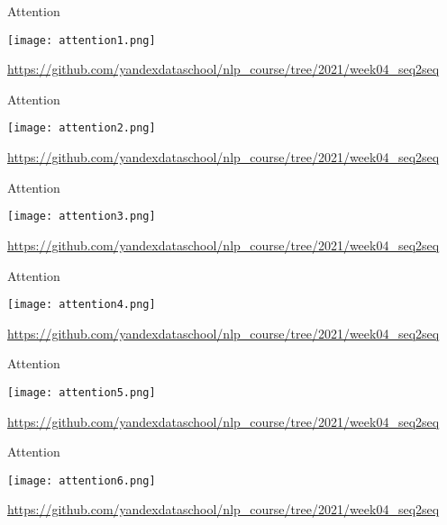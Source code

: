\documentclass[notes,12pt, aspectratio=169]{beamer}
\begin{document}
\begin{frame}{Attention}
	\begin{center}
		\texttt{[image: attention1.png]}
	\end{center}
	\vfill
	\footnotesize  {\color{blue} \url{https://github.com/yandexdataschool/nlp_course/tree/2021/week04_seq2seq}} 
\end{frame} 

\begin{frame}{Attention}
	\begin{center}
		\texttt{[image: attention2.png]}
	\end{center}
	\vfill
	\footnotesize  {\color{blue} \url{https://github.com/yandexdataschool/nlp_course/tree/2021/week04_seq2seq}} 
\end{frame} 

\begin{frame}{Attention}
	\begin{center}
		\texttt{[image: attention3.png]}
	\end{center}
	\vfill
	\footnotesize  {\color{blue} \url{https://github.com/yandexdataschool/nlp_course/tree/2021/week04_seq2seq}} 
\end{frame} 

\begin{frame}{Attention}
	\begin{center}
		\texttt{[image: attention4.png]}
	\end{center}
	\vfill
	\footnotesize  {\color{blue} \url{https://github.com/yandexdataschool/nlp_course/tree/2021/week04_seq2seq}} 
\end{frame} 

\begin{frame}{Attention}
	\begin{center}
		\texttt{[image: attention5.png]}
	\end{center}
	\vfill
	\footnotesize  {\color{blue} \url{https://github.com/yandexdataschool/nlp_course/tree/2021/week04_seq2seq}} 
\end{frame} 

\begin{frame}{Attention}
	\begin{center}
		\texttt{[image: attention6.png]}
	\end{center}
	\vfill
	\footnotesize  {\color{blue} \url{https://github.com/yandexdataschool/nlp_course/tree/2021/week04_seq2seq}} 
\end{frame} 
\end{document}
